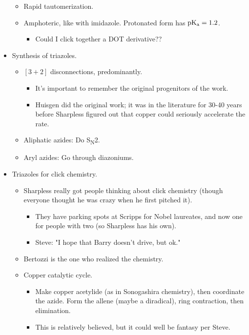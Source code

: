 \documentclass[../notes.tex]{subfiles}
\begin{document}
\begin{itemize}
\begin{itemize}
        \item Rapid tautomerization.
        \item Amphoteric, like with imidazole. Protonated form has $\operatorname{\text{p}K_\text{a}}=1.2$.
        \begin{itemize}
            \item Could I click together a DOT derivative??
        \end{itemize}
    \end{itemize}
    \item Synthesis of triazoles.
    \begin{itemize}
        \item $[3+2]$ disconnections, predominantly.
        \begin{itemize}
            \item It's important to remember the original progenitors of the work.
            \item Huisgen did the original work; it was in the literature for 30-40 years before Sharpless figured out that copper could seriously accelerate the rate.
        \end{itemize}
        \item Aliphatic azides: Do S\textsubscript{N}2.
        \item Aryl azides: Go through diazoniums.
    \end{itemize}
    \item Triazoles for click chemistry.
    \begin{itemize}
        \item Sharpless really got people thinking about click chemistry (though everyone thought he was crazy when he first pitched it).
        \begin{itemize}
            \item They have parking spots at Scripps for Nobel laureates, and now one for people with two (so Sharpless has his own).
            \item Steve: "I hope that Barry doesn't drive, but ok."
        \end{itemize}
        \item Bertozzi is the one who realized the chemistry.
        \item Copper catalytic cycle.
        \begin{itemize}
            \item Make copper acetylide (as in Sonogashira chemistry), then coordinate the azide. Form the allene (maybe a diradical), ring contraction, then elimination.
            \item This is relatively believed, but it could well be fantasy per Steve.

\end{itemize}
\end{itemize}
\end{itemize}
\end{document}

